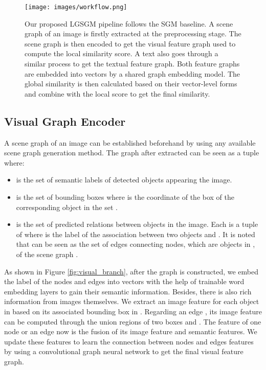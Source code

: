 \documentclass{IOS-Book-Article}
\begin{document}
\begin{figure*}[ht!]
  \centering
  \texttt{[image: images/workflow.png]}
  \caption{Our proposed LGSGM pipeline follows the SGM baseline. A scene graph of an image is firstly extracted at the preprocessing stage. The scene graph is then encoded to get the visual feature graph used to compute the local similarity score. A text also goes through a similar process to get the textual feature graph. Both feature graphs are embedded into vectors by a shared graph embedding model. The global similarity is then calculated based on their vector-level forms and combine with the local score to get the final similarity.}
  \label{fig:workflow}
\end{figure*}

\subsection{Visual Graph Encoder}
A scene graph of an image can be established beforehand by using any available scene graph generation method. 
The graph  after extracted can be seen as a tuple  where: 
\begin{itemize}
    \item  is the set of  semantic labels of detected objects appearing the image.
    \item  is the set of bounding boxes where  is the coordinate of the box of the corresponding object  in the set .
    \item  is the set of  predicted relations between objects in the image. Each  is a tuple of  where  is the label of the association between two objects  and . It is noted that  can be seen as the set of edges connecting nodes, which are objects in , of the scene graph .
\end{itemize}
As shown in Figure \ref{fig:visual_branch}, after the graph is constructed, we embed the label of the nodes and edges into vectors with the help of trainable word embedding layers to gain their semantic information. Besides, there is also rich information from images themselves. We extract an image feature for each object in  based on its associated bounding box in . Regarding an edge , its image feature can be computed through the union regions of two boxes  and . The feature of one node or an edge now is the fusion of its image feature and semantic features. We update these features to learn the connection between nodes and edges features by using a convolutional graph neural network \cite{wu2020comprehensive} to get the final visual feature graph.
\end{document}
